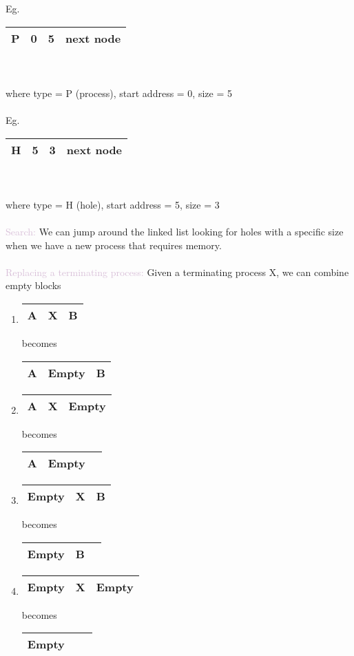 \documentclass[a4paper,10pt]{article}
\begin{document}
Eg.
\begin{tabular}{ |c|c|c|c| } 
\hline
P &0 &5 &next node \\
\hline
\end{tabular}
\\\\
where type = P (process), start address = 0, size = 5 \\\\
Eg. 
\begin{tabular}{ |c|c|c|c| } 
\hline
H &5 &3 &next node \\
\hline
\end{tabular}
\\\\
where type = H (hole), start address = 5, size = 3 \\\\
 \textcolor{Thistle}{Search:} We can jump around the linked list looking for holes with a specific size when we have a new process that requires memory. \\\\
\textcolor{Thistle}{Replacing a terminating process:} Given a terminating process X, we can combine empty blocks 
\begin{enumerate}
\item \begin{tabular}{ |c|c|c| } 
\hline
A &X &B \\
\hline
\end{tabular} 
becomes 
\begin{tabular}{ |c|c|c| } 
\hline
A &Empty &B \\
\hline
\end{tabular}
\item \begin{tabular}{ |c|c|c| } 
\hline
A &X &Empty \\
\hline
\end{tabular}
becomes 
\begin{tabular}{ |c|c|c| } 
\hline
A &Empty \\
\hline
\end{tabular}
\item \begin{tabular}{ |c|c|c| } 
\hline
Empty &X &B \\
\hline
\end{tabular} 
becomes 
\begin{tabular}{ |c|c|c| } 
\hline
Empty &B \\
\hline
\end{tabular}
\item \begin{tabular}{ |c|c|c| } 
\hline
Empty &X &Empty \\
\hline
\end{tabular}
becomes 
\begin{tabular}{ |c|c|c| } 
\hline
Empty \\
\hline
\end{tabular}
\\
\end{enumerate}
\end{document}
